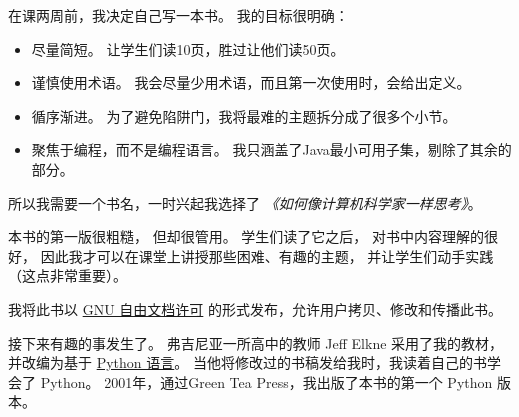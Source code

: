 在课两周前，我决定自己写一本书。 我的目标很明确：

\begin{itemize}

\item 尽量简短。 让学生们读10页，胜过让他们读50页。

\item 谨慎使用术语。 我会尽量少用术语，而且第一次使用时，会给出定义。

\item 循序渐进。 为了避免陷阱门，我将最难的主题拆分成了很多个小节。

\item 聚焦于编程，而不是编程语言。 我只涵盖了Java最小可用子集，剔除了其余的部分。

\end{itemize}


所以我需要一个书名，一时兴起我选择了 \emph{《如何像计算机科学家一样思考》}。


本书的第一版很粗糙， 但却很管用。
学生们读了它之后， 对书中内容理解的很好， 因此我才可以在课堂上讲授那些困难、有趣的主题， 并让学生们动手实践（这点非常重要）。


我将此书以 \href{https://en.wikipedia.org/wiki/GNU_Free_Documentation_License}{GNU 自由文档许可} 的形式发布，允许用户拷贝、修改和传播此书。
 


接下来有趣的事发生了。 弗吉尼亚一所高中的教师 Jeff Elkne 采用了我的教材， 并改编为基于 \href{http://www.python.org/}{Python 语言}。
当他将修改过的书稿发给我时，我读着自己的书学会了 Python。
2001年，通过Green Tea Press，我出版了本书的第一个 Python 版本。

